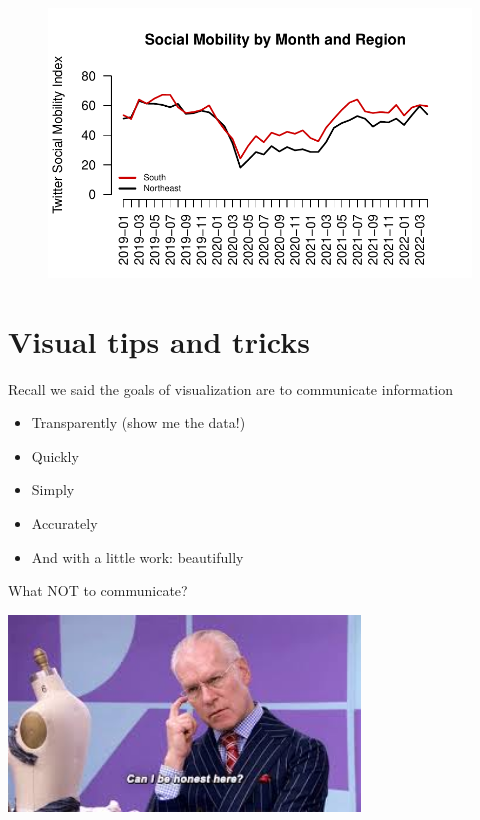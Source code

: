 \documentclass[
  letterpaper,
  DIV=11,
  numbers=noendperiod]{scrreprt}
\providecommand{\tightlist}{%
  \setlength{\itemsep}{0pt}\setlength{\parskip}{0pt}}\usepackage{longtable,booktabs,array}
\begin{document}
\begin{figure}[H]

{\centering \includegraphics{04-Visualization_files/figure-pdf/unnamed-chunk-43-1.pdf}

}

\end{figure}

\hypertarget{visual-tips-and-tricks}{%
\section{Visual tips and tricks}\label{visual-tips-and-tricks}}

Recall we said the goals of visualization are to communicate information

\begin{itemize}
\tightlist
\item
  Transparently (show me the data!)
\item
  Quickly
\item
  Simply
\item
  Accurately
\item
  And with a little work: beautifully
\end{itemize}

What NOT to communicate?

\includegraphics[width=0.7\textwidth,height=\textheight]{images/honestrunway.jpeg}
\end{document}
